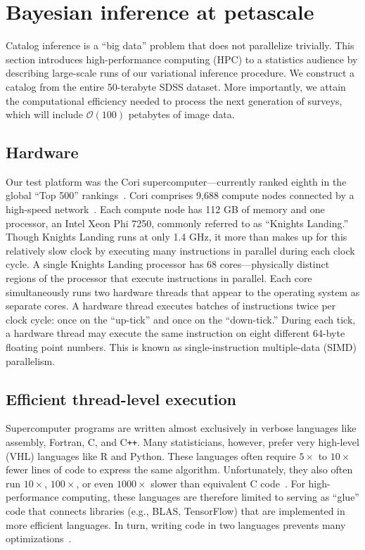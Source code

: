 \section{Bayesian inference at petascale}
\label{sec:at-scale}

Catalog inference is a ``big data'' problem that does not parallelize trivially.
This section introduces high-performance computing (HPC) to a statistics audience by describing large-scale runs of our variational inference procedure.
We construct a catalog from the entire 50-terabyte SDSS dataset. More importantly, we attain the computational efficiency needed to process the next generation of surveys, which will include $\mathcal O(100)$ petabytes of image data.

\subsection{Hardware}

Our test platform was the Cori supercomputer---currently ranked eighth in the global ``Top 500'' rankings~\citep{top500}.
Cori comprises 9,688 compute nodes connected by a high-speed network~\citep{cori}.
Each compute node has 112 GB of memory and one processor, an Intel Xeon Phi 7250, commonly referred to as ``Knights Landing.''
Though Knights Landing runs at only 1.4 GHz, it more than makes up for this relatively slow clock by executing many instructions in parallel during each clock cycle.
A single Knights Landing processor has 68 cores---physically distinct regions of the processor that execute instructions in parallel.
Each core simultaneously runs two hardware threads that appear to the operating system as separate cores.
A hardware thread executes batches of instructions twice per clock cycle: once on the ``up-tick'' and once on the ``down-tick.''
During each tick, a hardware thread may execute the same instruction on eight different 64-byte floating point numbers. This is known as single-instruction multiple-data (SIMD) parallelism.


\subsection{Efficient thread-level execution}
\label{thread}

Supercomputer programs are written almost exclusively in verbose languages like assembly, Fortran, C, and C\texttt{++}.
Many statisticians, however, prefer very high-level (VHL) languages like R and Python.
These languages often require $5\times$ to $10\times$ fewer lines of code to express the same algorithm.
Unfortunately, they also often run $10\times$, $100\times$, or even $1000\times$ slower than equivalent C code~\citep{juliabenchmarks}.
For high-performance computing, these languages are therefore limited to serving as ``glue'' code that connects libraries (e.g., BLAS, TensorFlow) that are implemented in more efficient languages.
In turn, writing code in two languages prevents many optimizations~\citep{bezanson2017julia}.

